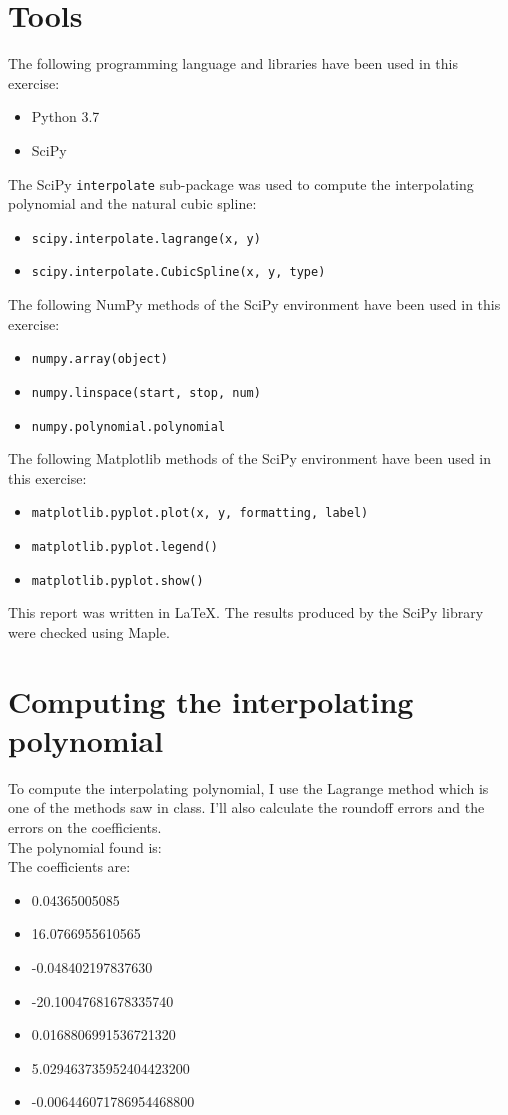 \documentclass{article}
\newcommand{\code}{\texttt}
\begin{document}
\section{Tools}
The following programming language and libraries have been used in this exercise:
\begin{itemize}
  \item Python 3.7
  \item SciPy
\end{itemize}
The SciPy \code{interpolate} sub-package was used to compute the interpolating polynomial and the natural cubic spline:
\begin{itemize}
  \item \code{scipy.interpolate.lagrange(x, y)}
  \item \code{scipy.interpolate.CubicSpline(x, y, type)}
\end{itemize}

The following NumPy methods of the SciPy environment have been used in this exercise:
\begin{itemize}
  \item \code{numpy.array(object)}
  \item \code{numpy.linspace(start, stop, num)}
  \item \code{numpy.polynomial.polynomial}
  \end{itemize}
The following Matplotlib methods of the SciPy environment have been used in this exercise:
 \begin{itemize}
  \item \code{matplotlib.pyplot.plot(x, y, formatting, label)}
  \item \code{matplotlib.pyplot.legend()}
  \item \code{matplotlib.pyplot.show()}
  \end{itemize}
This report was written in \LaTeX. The results produced by the SciPy library were checked using Maple.
  
\section{Computing the interpolating polynomial}
To compute the interpolating polynomial, I use the Lagrange method which is one of the methods saw in class. I'll also calculate the roundoff errors and the errors on the coefficients. \\
The polynomial found is: \\
[0.25cm]

The coefficients are: 
 \begin{itemize}
  \item 0.04365005085
  \item 16.0766955610565
  \item -0.048402197837630
  \item -20.10047681678335740
  \item 0.0168806991536721320
  \item 5.029463735952404423200
  \item -0.006446071786954468800
  \end{itemize}
\end{document}
